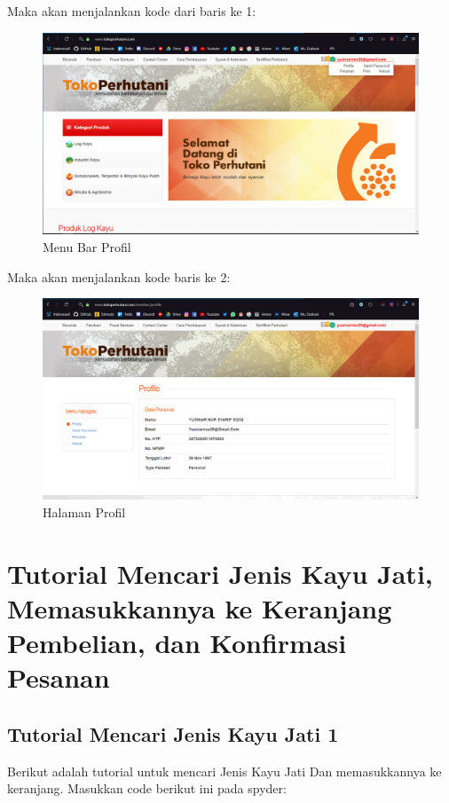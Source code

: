 Maka akan menjalankan kode dari baris ke 1:
\begin{figure}[h]
	\centering
	\includegraphics[scale=0.25]{figures/735menuprofile}
	\caption{Menu Bar Profil}
\end{figure}
\newpage
Maka akan menjalankan kode baris ke 2:
\begin{figure}[h]
	\centering
	\includegraphics[scale=0.25]{figures/735profilektp}
	\caption{Halaman Profil}
\end{figure}

\newpage
\section{Tutorial Mencari Jenis Kayu Jati, Memasukkannya ke Keranjang Pembelian, dan Konfirmasi Pesanan }

\subsection{Tutorial Mencari Jenis Kayu Jati 1}
Berikut adalah tutorial untuk mencari Jenis Kayu Jati Dan memasukkannya ke keranjang. Masukkan code berikut ini pada spyder:

